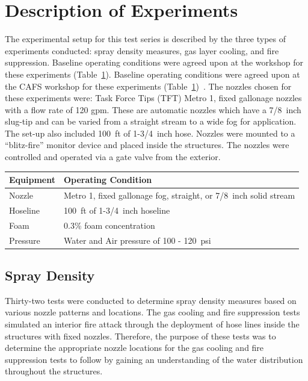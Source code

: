 \documentclass[12pt,oneside]{book}
\begin{document}
\section{Description of Experiments}
\label{sec:desc_experiments}
The experimental setup for this test series is described by the three types of experiments conducted: spray density measures, gas layer cooling, and fire suppression.   Baseline operating conditions were agreed upon at the workshop for these experiments (Table~\ref{tab:op_condition}).   Baseline operating conditions were agreed upon at the CAFS workshop for these experiments (Table~\ref{tab:op_condition})~\cite{Grant:2011}.   The nozzles chosen for these experiments were: Task Force Tips (TFT) Metro 1, fixed gallonage nozzles with a flow rate of 120 gpm. These are automatic nozzles which have a 7/8~inch slug-tip and can be varied from a straight stream to a wide fog for application. The set-up also included 100~ft of 1-3/4~inch hose. Nozzles were mounted to a ``blitz-fire'' monitor device and placed inside the structures. The nozzles were controlled and operated via a gate valve from the exterior.

\begin{table}[!ht]
\centering
{}\label{tab:op_condition}
\begin{tabular}{ll}
\toprule[1.5pt]
Equipment    &   Operating Condition \\
\midrule
Nozzle       & Metro 1, fixed gallonage fog, straight, or 7/8~inch solid stream \\
Hoseline     & 100~ft of 1-3/4~inch hoseline \\
Foam         & 0.3\% foam concentration \\
Pressure     & Water and Air pressure of 100 - 120~psi \\
\bottomrule[1.25pt]
\end{tabular}\par
\end{table}


\subsection{Spray Density}
\label{sec:desc_Spray_Density}

Thirty-two tests were conducted to determine spray density measures based on various nozzle patterns and locations. The gas cooling and fire suppression tests simulated an interior fire attack through the deployment of hose lines inside the structures with fixed nozzles. Therefore, the purpose of these tests was to determine the appropriate nozzle locations for the gas cooling and fire suppression tests to follow by gaining an understanding of the water distribution throughout the structures.
\end{document}
